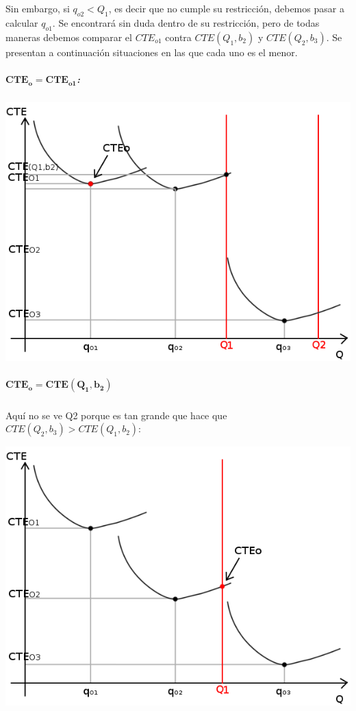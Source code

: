 \documentclass[a4paper,10pt]{article}
\begin{document}
	\subparagraph{} Sin embargo, si $q_{o2} < Q_1$, es decir que no cumple su restricción, debemos pasar a calcular $ q_{o1} $. Se encontrará sin duda dentro de su restricción, pero de todas maneras debemos comparar el $CTE_{o1}$ contra $CTE(Q_1, b_2)$ y $CTE(Q_2, b_3)$. Se presentan a continuación situaciones en las que cada uno es el menor.

	\subparagraph{$\mathbf{CTE_o = CTE_{o1}}$:}
	\begin{center}
	\includegraphics[scale=0.4,keepaspectratio=true]{img/6/6_CTE_1.png} 
	\end{center}

	\subparagraph{$\mathbf{CTE_o = CTE(Q_1, b_2)}$} Aquí no se ve Q2 porque es tan grande que hace que $CTE(Q_2, b_3) > CTE(Q_1, b_2)$:
	\begin{center}
	\includegraphics[scale=0.4,keepaspectratio=true]{img/6/6_CTE_Q1.png} 
	\end{center}
\end{document}
